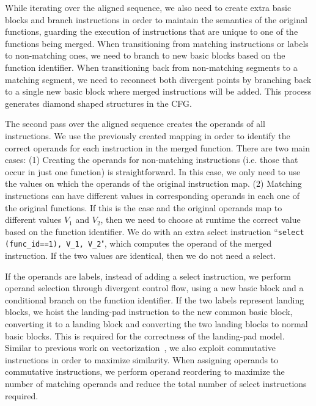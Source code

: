 While iterating over the aligned sequence, we also need to create extra basic
blocks and branch instructions in order to maintain the semantics of the
original functions, guarding the execution of instructions that are unique to
one of the functions being merged.
When transitioning from matching instructions or labels to non-matching ones,
we need to branch to new basic blocks based on the function identifier.
When transitioning back from non-matching segments to a matching segment, we need
to reconnect both divergent points by branching back to a single new basic block
where merged instructions will be added.
This process generates diamond shaped structures in the CFG. %



The second pass over the aligned sequence creates the operands of all instructions.
We use the previously created mapping in order to identify the correct operands for each instruction in the merged function.
There are two main cases:
(1) Creating the operands for non-matching instructions (i.e. those that occur in just one function) is straightforward.
In this case, we only need to use the values on which the operands of the original instruction map.
(2) Matching instructions can have different values in corresponding operands in each one of the original functions.
If this is the case and the original operands map to different values $V_1$ and $V_2$, then we need to choose at runtime the correct value based on the function identifier.
We do with an extra select instruction ``\texttt{select (func\_id==1), V\_1, V\_2}", which computes the operand of the merged instruction.
If the two values are identical, then we do not need a select.

If the operands are labels, instead of adding a select instruction, we perform
operand selection through divergent control flow, using a new basic
block and a conditional branch on the function identifier.
If the two labels represent landing blocks, we hoist the landing-pad
instruction to the new common basic block, converting it to a landing block and
converting the two landing blocks to normal basic blocks.
This is required for the correctness of the landing-pad model.
Similar to previous work on vectorization~\cite{porpodas18}, we
also exploit commutative instructions in order to maximize similarity.
When assigning operands to commutative instructions, we perform operand
reordering to maximize the number of matching operands and reduce the total
number of select instructions required.

